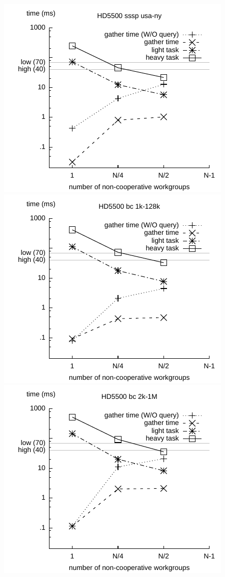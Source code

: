 \documentclass[sigconf]{acmart}
\begin{document}
{\includegraphics[width=.7\columnwidth]{images/barrier/hd5500_sssp_usa_ny.pdf} \\
\includegraphics[width=.7\columnwidth]{images/barrier/hd5500_bc_1k_128k.pdf} \\
\includegraphics[width=.7\columnwidth]{images/barrier/hd5500_bc_2k_1M.pdf} \\
}
\end{document}

